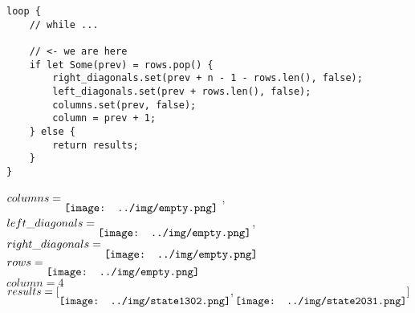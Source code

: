 \begin{frame}[fragile]
    \begin{verbatim}
loop {
    // while ...
    
    // <- we are here
    if let Some(prev) = rows.pop() {
        right_diagonals.set(prev + n - 1 - rows.len(), false);
        left_diagonals.set(prev + rows.len(), false);
        columns.set(prev, false);
        column = prev + 1;    
    } else {
        return results;
    }
}
    \end{verbatim}
    $columns = \raisebox{-2ex}{\texttt{[image: ../img/empty.png]}}$ ,
    $left\_diagonals = \raisebox{-2ex}{\texttt{[image: ../img/empty.png]}}$,
    $right\_diagonals = \raisebox{-2ex}{\texttt{[image: ../img/empty.png]}}$ \\
    $rows = \raisebox{-2ex}{\texttt{[image: ../img/empty.png]}}$ \\
    $column = 4$
    $results = [
    \raisebox{-2ex}{\texttt{[image: ../img/state1302.png]}},
    \raisebox{-2ex}{\texttt{[image: ../img/state2031.png]}}
    ]$
\end{frame}